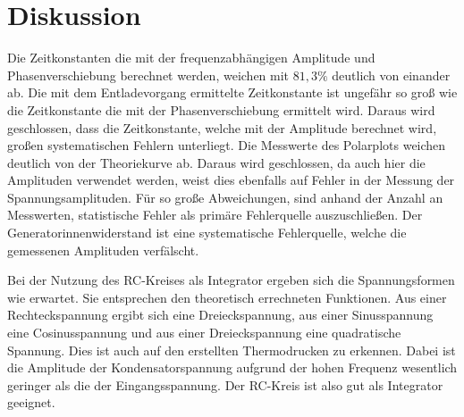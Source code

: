 \section{Diskussion}
\label{sec:Diskussion}

Die Zeitkonstanten die mit der frequenzabhängigen Amplitude und Phasenverschiebung berechnet werden, weichen mit $81,3\%$
deutlich von einander ab.
Die mit dem Entladevorgang ermittelte Zeitkonstante ist ungefähr so groß wie die Zeitkonstante die mit der
Phasenverschiebung ermittelt wird. Daraus wird geschlossen, dass die Zeitkonstante, welche mit der Amplitude
berechnet wird, großen systematischen Fehlern unterliegt.
Die Messwerte des Polarplots weichen deutlich von der Theoriekurve ab. Daraus wird geschlossen, da auch hier die
Amplituden verwendet werden, weist dies ebenfalls auf Fehler in der Messung der Spannungsamplituden. Für so
große Abweichungen, sind anhand der Anzahl an Messwerten, statistische Fehler als primäre Fehlerquelle auszuschließen.
Der Generatorinnenwiderstand ist eine systematische Fehlerquelle, welche die gemessenen Amplituden verfälscht.

Bei der Nutzung des RC-Kreises als Integrator ergeben sich die Spannungsformen
wie erwartet. Sie entsprechen den theoretisch errechneten Funktionen.
Aus einer Rechteckspannung ergibt sich eine Dreieckspannung, aus einer
Sinusspannung eine Cosinusspannung und aus einer Dreieckspannung eine
quadratische Spannung. Dies ist auch auf den erstellten Thermodrucken zu erkennen.
Dabei ist die Amplitude der Kondensatorspannung aufgrund der hohen Frequenz wesentlich
geringer als die der Eingangsspannung. Der RC-Kreis ist also gut als Integrator
geeignet.

